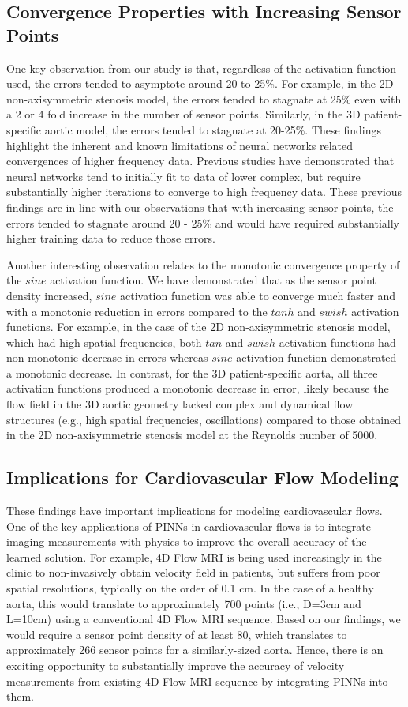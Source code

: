 \documentclass[times,twocolumn,final]{elsarticle}
\begin{document}
{\subsection {Convergence Properties with Increasing Sensor Points}
One key observation from our study is that, regardless of the activation function used, the errors tended to asymptote around 20 to 25\%. For example, in the 2D non-axisymmetric stenosis model, the errors tended to stagnate at 25\% even with a 2 or 4 fold increase in the number of sensor points. Similarly, in the 3D patient-specific aortic model, the errors tended to stagnate at 20-25\%. These findings highlight the inherent and known limitations of neural networks related convergences of higher frequency data. Previous studies have demonstrated that neural networks tend to initially fit to data of lower complex, but require substantially higher iterations to converge to high frequency data. These previous findings are in line with our observations that with increasing sensor points, the errors tended to stagnate around 20 - 25\% and would have required substantially higher training data to reduce those errors.

Another interesting observation relates to the monotonic convergence property of the $sine$ activation function. We have demonstrated that as the sensor point density increased, $sine$ activation function was able to converge much faster and with a monotonic reduction in errors compared to the $tanh$ and $swish$ activation functions. For example, in the case of the 2D non-axisymmetric stenosis model, which had high spatial frequencies, both $tan$ and $swish$ activation functions had non-monotonic decrease in errors whereas $sine$ activation function demonstrated a monotonic decrease. In contrast, for the 3D patient-specific aorta, all three activation functions produced a monotonic decrease in error, likely because the flow field in the 3D aortic geometry lacked complex and dynamical flow structures (e.g., high spatial frequencies, oscillations) compared to those obtained in the 2D non-axisymmetric stenosis model at the Reynolds number of 5000.

\subsection{Implications for Cardiovascular Flow Modeling}
These findings have important implications for modeling cardiovascular flows. One of the key applications of PINNs in cardiovascular flows is to integrate imaging measurements with physics to improve the overall accuracy of the learned solution. For example, 4D Flow MRI is  being used increasingly in the clinic to non-invasively obtain velocity field in patients, but suffers from poor spatial resolutions, typically on the order of 0.1 cm. In the case of a healthy aorta, this would translate to approximately 700 points (i.e., D=3cm and L=10cm) using a conventional 4D Flow MRI sequence. Based on our findings, we would require a sensor point density of at least 80, which translates to approximately 266 sensor points for a similarly-sized aorta. Hence, there is an exciting opportunity to substantially improve the accuracy of velocity measurements from existing 4D Flow MRI sequence by integrating PINNs into them. 

}
\end{document}
